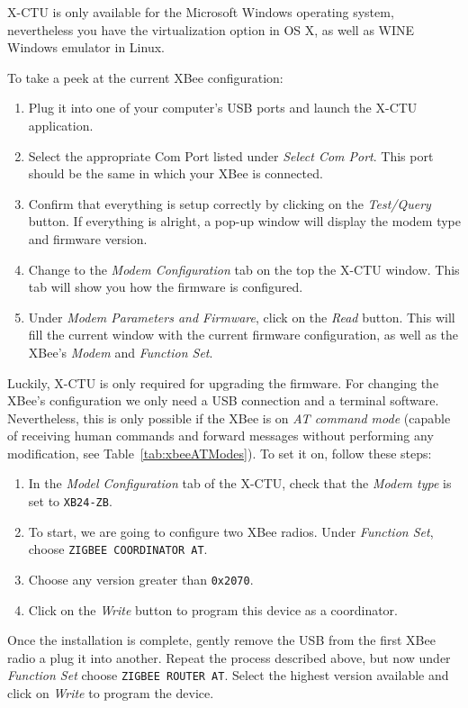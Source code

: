 X-CTU is only available for the Microsoft Windows operating system, nevertheless you have the virtualization option in OS X, as well as WINE Windows emulator in Linux. 

To take a peek at the current XBee configuration: 

\begin{enumerate}
	\item Plug it into one of your computer's USB ports and launch the X-CTU application.
	\item Select the appropriate Com Port listed under \emph{Select Com Port}. This port should be the same in which your XBee is connected.
	\item Confirm that everything is setup correctly by clicking on the \emph{Test/Query} button. If everything is alright, a pop-up window will display the modem type and firmware version.
	\item Change to the \emph{Modem Configuration} tab on the top the X-CTU window. This tab will show you how the firmware is configured.
	\item Under \emph{Modem Parameters and Firmware}, click on the \emph{Read} button. This will fill the current window with the current firmware configuration, as well as the XBee's \emph{Modem} and \emph{Function Set}.
\end{enumerate}

Luckily, X-CTU is only required for upgrading the firmware. For changing the XBee's configuration we only need a USB connection and a terminal software. Nevertheless, this is only possible if the XBee is on \emph{AT command mode} (capable of receiving human commands and forward messages without performing any modification, see Table~\ref{tab:xbeeATModes}). To set it on, follow these steps:

\begin{enumerate}
	\item In the \emph{Model Configuration} tab of the X-CTU, check that the \emph{Modem type} is set to \texttt{XB24-ZB}.
	\item To start, we are going to configure two XBee radios. Under \emph{Function Set}, choose \texttt{ZIGBEE COORDINATOR AT}.
	\item Choose any version greater than \texttt{0x2070}.
	\item Click on the \emph{Write} button to program this device as a coordinator.
\end{enumerate}

Once the installation is complete, gently remove the USB from the first XBee radio a plug it into another. Repeat the process described above, but now under \emph{Function Set} choose \texttt{ZIGBEE ROUTER AT}. Select the highest version available and click on \emph{Write} to program the device.

